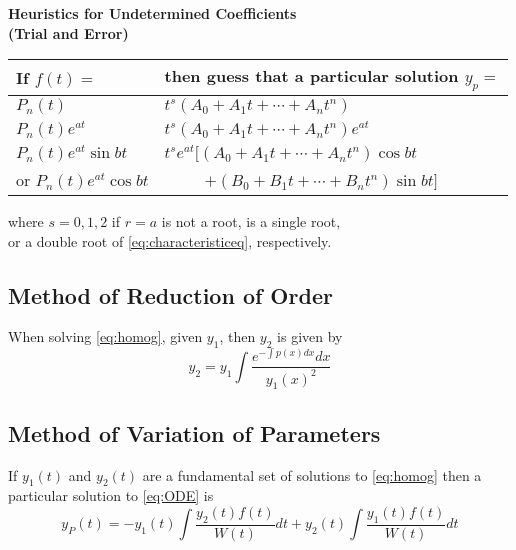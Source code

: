 \documentclass[10pt,leqno]{article}
\begin{document}
\begin{multicols}{2}
\begin{center}
\textbf{Heuristics for Undetermined Coefficients\\ (Trial and Error)}
\begin{small}
\begin{tabular}{|l|l|}
\hline 
If $f(t)=$ & then guess that a particular solution $y_p=$ \\
\hline
$P_n(t)$ & $t^s (A_0 + A_1 t + \cdots + A_n t^n)$ \\
\hline 
$P_n(t)e^{at}$ & $t^s (A_0 + A_1 t + \cdots + A_n t^n)e^{at}$ \\
\hline
$P_n(t)e^{at}\sin bt$ & $t^s e^{at} [(A_0 + A_1 t + \cdots + A_n t^n)\cos bt$ \\
or $P_n(t)e^{at}\cos bt$ & \ \ \ \ \ $ + (B_0 + B_1 t + \cdots + B_n t^n)\sin bt]$ \\
\hline 
\end{tabular}
where $s=0,1,2$ if $r=a$ is not a root, is a single root, \\or a double root of \eqref{eq:characteristiceq}, respectively.
\end{small}
\end{center}

\subsection*{Method of Reduction of Order}
When solving \eqref{eq:homog}, given $y_1$, then $y_2$ is given by 
\begin{equation}\label{eq:ROE}
y_2 = y_1\int \dfrac{e^{-\int p(x) dx} dx}{y_1(x)^2}
\end{equation}

\subsection*{Method of Variation of Parameters}
If $y_1(t)$ and $y_2(t)$ are a fundamental set of solutions to \eqref{eq:homog} then a particular solution to \eqref{eq:ODE} is 
\begin{equation}
y_P(t) = -y_1(t) \int \dfrac{y_2(t) f(t)}{W(t)}dt
+ y_2(t) \int \dfrac{y_1(t) f(t)}{W(t)}dt 
\end{equation}


\end{multicols}
\end{document}
